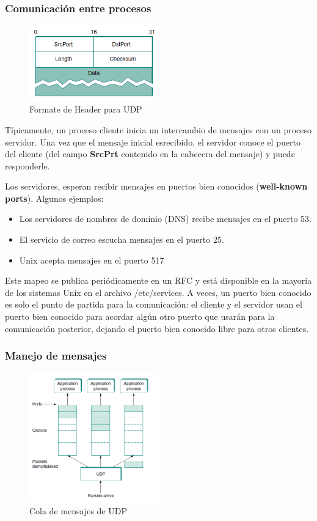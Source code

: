 \subsubsection{Comunicación entre procesos}
\begin{figure}[H]
	\centering
	\includegraphics[width=0.5\textwidth
]{images/udp-header.png}
	\caption[Formate de Header para UDP]{Formate de Header para UDP}
	\label{fig:udp-header}
\end{figure}
Típicamente, un proceso cliente inicia un intercambio de mensajes con un proceso servidor. Una vez que el mensaje inicial esrecibido, el servidor conoce el puerto del cliente (del campo \textbf{SrcPrt} contenido en la cabecera del mensaje) y puede responderle. 

Los servidores, esperan recibir mensajes en puertos bien conocidos (\textbf{well-known ports}). Algunos ejemplos:
\begin{itemize}
  \item Los servidores de nombres de dominio (DNS) recibe mensajes en el puerto 53.
  \item El servicio de correo escucha mensajes en el puerto 25.
  \item Unix acepta mensajes en el puerto 517
\end{itemize}

Este mapeo se publica periódicamente en un RFC y está disponible en la mayoría de los sistemas Unix en el archivo /etc/services. A veces, un puerto bien conocido es solo el punto de partida para la comunicación: el cliente y el servidor usan el puerto bien conocido para acordar algún otro puerto que usarán para la comunicación posterior, dejando el puerto bien conocido libre para otros clientes.

\subsubsection{Manejo de mensajes}
\begin{figure}[H]
	\centering
	\includegraphics[width=0.5\textwidth
]{images/udp-message-queue.png}
	\caption[Cola de mensajes de UDP]{Cola de mensajes de UDP}
	\label{fig:udp-message-queue}
\end{figure}

